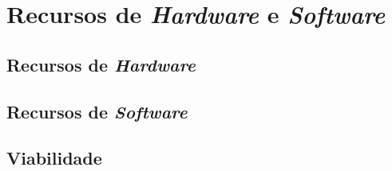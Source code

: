 \chapter{Recursos de \emph{Hardware} e \emph{Software}}

\section{Recursos de \emph{Hardware}}

\section{Recursos de \emph{Software}}

\section{Viabilidade}
